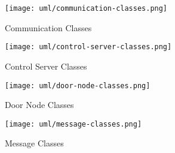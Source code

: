 \begin{figure}[!htb]
\centering
\texttt{[image: uml/communication-classes.png]}
\caption{Communication Classes}
\label{fig:communication-classes}
\end{figure}


\begin{figure}[!htb]
\centering
\texttt{[image: uml/control-server-classes.png]}
\caption{Control Server Classes}
\label{fig:control-server-classes}
\end{figure}


\begin{figure}[!htb]
\centering
\texttt{[image: uml/door-node-classes.png]}
\caption{Door Node Classes}
\label{fig:door-node-classes}
\end{figure}


\begin{figure}[!htb]
\centering
\texttt{[image: uml/message-classes.png]}
\caption{Message Classes}
\label{fig:message-classes}
\end{figure}

